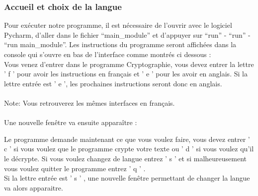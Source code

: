 \documentclass[a4paper,12pt,abstracton,titlepage]{scrartcl}
\begin{document}
\subsubsection{Accueil et choix de la langue}
Pour exécuter notre programme, il est nécessaire de l'ouvrir avec le logiciel Pycharm, d'aller dans le fichier "`main\_module"' et d'appuyer sur "`run"' - "`run"' - "`run main\_module"'.
Les instructions du programme seront affichées dans la console qui s'ouvre en bas de l'interface comme montrés ci dessous :
\vspace{0.5cm}
\\
{
	\label{SP}
}
\vspace{0.5cm}
Vous venez d’entrer dans le programme Cryptographie, vous devez entrer la lettre ' f ' pour avoir les instructions en français et ' e ' pour les avoir en anglais.
Si la lettre entrée est ' e ', les prochaines instructions seront donc en anglais. \\
\\
Note: Vous retrouverez les mêmes interfaces en français.\\
\\
Une nouvelle fenêtre va ensuite apparaître :
\vspace{0.5cm}
\\
{	%
\label{EMM}
}
\vspace{0.5cm}

Le programme demande maintenant ce que vous voulez faire, vous devez entrer ' c ' si vous voulez que le programme crypte votre texte ou ' d ' si vous voulez qu'il le décrypte.
Si vous voulez changez de langue entrez ' s ' et si malheureusement vous voulez quitter le programme entrez ' q ' .\\
\newpage
Si la lettre entrée est ' s ' , une nouvelle fenêtre permettant de changer la langue va alors apparaitre.
\vspace{0.5cm}
\\
{
\label{ESD}
}
\vspace{0.5cm}
\end{document}
